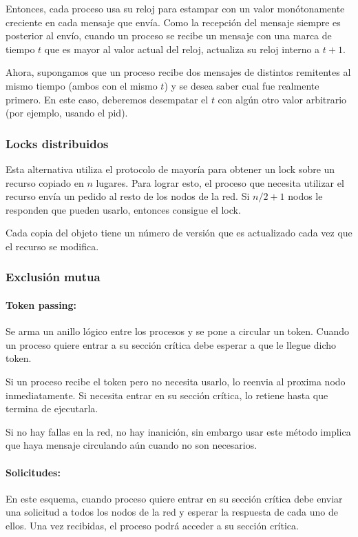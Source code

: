Entonces, cada proceso usa su reloj para estampar con un valor monótonamente creciente en cada mensaje que envía. Como la recepción del mensaje siempre es posterior al envío, cuando un proceso se recibe un mensaje con una marca de tiempo $t$ que es mayor al valor actual del reloj, actualiza su reloj interno a $t+1$.

Ahora, supongamos que un proceso recibe dos mensajes de distintos remitentes al mismo tiempo (ambos con el mismo $t$) y se desea saber cual fue realmente primero. En este caso, deberemos desempatar el $t$ con algún otro valor arbitrario (por ejemplo, usando el pid).

\subsubsection{Locks distribuidos}
Esta alternativa utiliza el protocolo de mayoría para obtener un lock sobre un recurso copiado en $n$ lugares. Para lograr esto, el proceso que necesita utilizar el recurso envía un pedido al resto de los nodos de la red. Si $n/2 + 1$ nodos le responden que pueden usarlo, entonces consigue el lock.

Cada copia del objeto tiene un número de versión que es actualizado cada vez que el recurso se modifica.

\subsubsection{Exclusión mutua}
\paragraph{Token passing:} Se arma un anillo lógico entre los procesos y se pone a circular un token. Cuando un proceso quiere entrar a su sección crítica debe esperar a que le llegue dicho token. 

Si un proceso recibe el token pero no necesita usarlo, lo reenvia al proxima nodo inmediatamente. Si necesita entrar en su sección crítica, lo retiene hasta que termina de ejecutarla.

Si no hay fallas en la red, no hay inanición, sin embargo usar este método implica que haya mensaje circulando aún cuando no son necesarios.

\paragraph{Solicitudes:} En este esquema, cuando proceso quiere entrar en su sección crítica debe enviar una solicitud a todos los nodos de la red y esperar la respuesta de cada uno de ellos. Una vez recibidas, el proceso podrá acceder a su sección crítica.

